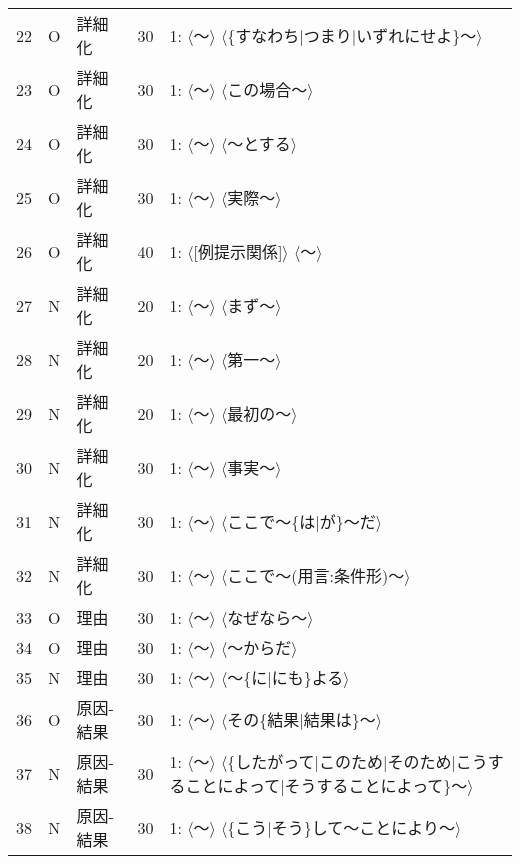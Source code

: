 {\begin{tabular}{@{}r|c|lr|p{9cm}@{}}
22 & O & 詳細化 & 30 & 1: $\langle$〜$\rangle$ $\langle$\{すなわち$|$つまり$|$いずれにせよ\}〜$\rangle$ \\\vspace*{-1mm}
23 & O & 詳細化 & 30 & 1: $\langle$〜$\rangle$ $\langle$この場合〜$\rangle$ \\\vspace*{-1mm}
24 & O & 詳細化 & 30 & 1: $\langle$〜$\rangle$ $\langle$〜とする$\rangle$ \\\vspace*{-1mm}
25 & O & 詳細化 & 30 & 1: $\langle$〜$\rangle$ $\langle$実際〜$\rangle$ \\\vspace*{-1mm}
26 & O & 詳細化 & 40 & 1: $\langle$[例提示関係]$\rangle$ $\langle$〜$\rangle$ \\\vspace*{-1mm}
27 & N & 詳細化 & 20 & 1: $\langle$〜$\rangle$ $\langle$まず〜$\rangle$ \\\vspace*{-1mm}
28 & N & 詳細化 & 20 & 1: $\langle$〜$\rangle$ $\langle$第一〜$\rangle$ \\\vspace*{-1mm}
29 & N & 詳細化 & 20 & 1: $\langle$〜$\rangle$ $\langle$最初の〜$\rangle$ \\\vspace*{-1mm}
30 & N & 詳細化 & 30 & 1: $\langle$〜$\rangle$ $\langle$事実〜$\rangle$ \\\vspace*{-1mm}
31 & N & 詳細化 & 30 & 1: $\langle$〜$\rangle$ $\langle$ここで〜\{は$|$が\}〜だ$\rangle$ \\\vspace*{-1mm}
32 & N & 詳細化 & 30 & 1: $\langle$〜$\rangle$ $\langle$ここで〜(用言:条件形)〜$\rangle$ \\\vspace*{-1mm}
33 & O & 理由 & 30 & 1: $\langle$〜$\rangle$ $\langle$なぜなら〜$\rangle$ \\\vspace*{-1mm}
34 & O & 理由 & 30 & 1: $\langle$〜$\rangle$ $\langle$〜からだ$\rangle$ \\\vspace*{-1mm}
35 & N & 理由 & 30 & 1: $\langle$〜$\rangle$ $\langle$〜\{に$|$にも\}よる$\rangle$ \\\vspace*{-1mm}
36 & O & 原因-結果 & 30 & 1: $\langle$〜$\rangle$ $\langle$その\{結果$|$結果は\}〜$\rangle$ \\\vspace*{-1mm}
37 & N & 原因-結果 & 30 & 1: $\langle$〜$\rangle$ $\langle$\{したがって$|$このため$|$そのため$|$こうすることによって$|$そうすることによって\}〜$\rangle$ \\
38 & N & 原因-結果 & 30 & 1: $\langle$〜$\rangle$ $\langle$\{こう$|$そう\}して〜ことにより〜$\rangle$ \\ \hline
\end{tabular}

}
